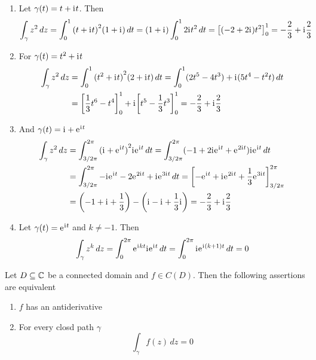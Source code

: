 \begin{examples}\hfill
	\begin{enumerate}
		\item Let \( \gamma(t) = t + \mathrm{i}\mkern1mu t \). Then
		      \[
			      \int_{\gamma} z^2\,dz
			      = \int_0^1 {(t + \mathrm{i}\mkern1mu t)}^2(1 + \mathrm{i}\mkern1mu)\,dt
			      = (1 + \mathrm{i}\mkern1mu)\int_0^1 2\mathrm{i}\mkern1mu t^2\,dt
				      = {\left[ (-2 + 2\mathrm{i}\mkern1mu) t^2 \right]}_0^1
			      = -\frac{2}{3} + \mathrm{i}\mkern1mu \frac{2}{3}
		      \]
		\item For \( \gamma(t) = t^2 + \mathrm{i}\mkern1mu t \)
		      \[
			      \begin{split}
				      \int_\gamma z^2\,dz
				      & = \int_0^1 {(t^2 + \mathrm{i}\mkern1mu t)}^2(2 + \mathrm{i}\mkern1mu t)\,dt = \int_0^1 (2t^5 - 4t^3) + \mathrm{i}\mkern1mu(5t^4 - t^2t)\,dt \\
				      & = {\left[ \frac{1}{3} t^6 - t^4 \right]}_0^1 + \mathrm{i}\mkern1mu {\left[ t^5 - \frac{1}{3}t^3 \right]}_0^1
				      = -\frac{2}{3} + \mathrm{i}\mkern1mu \frac{2}{3}
			      \end{split}
		      \]
		\item And \( \gamma(t) = \mathrm{i}\mkern1mu + \mathrm{e}\mkern1mu^{\mathrm{i}\mkern1mu t} \)
		      \[
			      \begin{split}
				      \int_\gamma z^2\,dz
				      & = \int_{3/2\pi}^{2\pi} {(\mathrm{i}\mkern1mu + \mathrm{e}\mkern1mu^{\mathrm{i}\mkern1mu t})}^2\mathrm{i}\mkern1mu\mathrm{e}\mkern1mu^{\mathrm{i}\mkern1mu t}\,dt
				      = \int_{3/2\pi}^{2\pi} (-1 + 2\mathrm{i}\mkern1mu\mathrm{e}\mkern1mu^{\mathrm{i}\mkern1mu t} + \mathrm{e}\mkern1mu^{2\mathrm{i}\mkern1mu t})\mathrm{i}\mkern1mu\mathrm{e}\mkern1mu^{\mathrm{i}\mkern1mu t}\,dt \\
				      & = \int_{3/2\pi}^{2\pi} -\mathrm{i}\mkern1mu\mathrm{e}\mkern1mu^{\mathrm{i}\mkern1mu t} - 2\mathrm{e}\mkern1mu^{2\mathrm{i}\mkern1mu t} + \mathrm{i}\mkern1mu\mathrm{e}\mkern1mu^{3\mathrm{i}\mkern1mu t}\,dt
					      = {\left[ -\mathrm{e}\mkern1mu^{\mathrm{i}\mkern1mu t} + \mathrm{i}\mkern1mu\mathrm{e}\mkern1mu^{2\mathrm{i}\mkern1mu t} + \frac{1}{3}\mathrm{e}\mkern1mu^{3\mathrm{i}\mkern1mu t}\right]}_{3/2\pi}^{2\pi} \\
				      & = \left( -1 + \mathrm{i}\mkern1mu + \frac{1}{3} \right) - \left( \mathrm{i}\mkern1mu - \mathrm{i}\mkern1mu + \frac{1}{3}\mathrm{i}\mkern1mu \right)
				      = -\frac{2}{3} + \mathrm{i}\mkern1mu \frac{2}{3}
			      \end{split}
		      \]
		\item Let \( \gamma(t) = \mathrm{e}\mkern1mu^{\mathrm{i}\mkern1mu t} \) and \( k \ne -1 \). Then
		      \[
			      \int_\gamma z^k\,dz =
			      \int_0^{2\pi} \mathrm{e}\mkern1mu^{\mathrm{i}\mkern1mu kt}\mathrm{i}\mkern1mu\mathrm{e}\mkern1mu^{\mathrm{i}\mkern1mu t}\,dt =
			      \int_0^{2\pi} \mathrm{i}\mkern1mu\mathrm{e}\mkern1mu^{\mathrm{i}\mkern1mu (k + 1) t}\,dt = 0
		      \]
	\end{enumerate}
\end{examples}
\bigskip


\begin{theorem}\label{thm:thm_antiderivative}
	Let \( D \subseteq \mathbb{C} \) be a connected domain and \( f \in C(D)\). Then the following assertions are equivalent
	\begin{enumerate}
		\item \( f \) has an antiderivative
		\item For every closd path \( \gamma \)
		      \[
			      \int_{\gamma} f(z)\,dz = 0
		      \]
	\end{enumerate}
\end{theorem}

